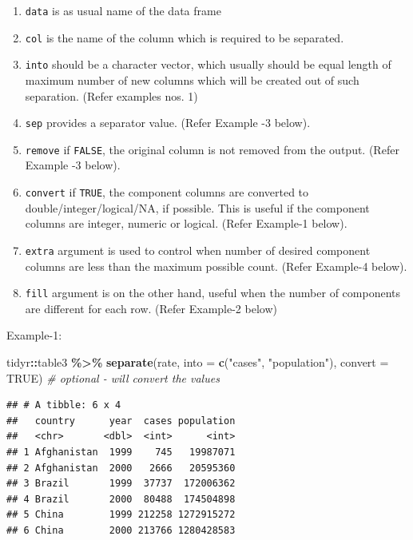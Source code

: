 \documentclass[
]{book}
\newenvironment{Shaded}{\begin{snugshade}}{\end{snugshade}}
\newcommand{\AttributeTok}[1]{\textcolor[rgb]{0.13,0.29,0.53}{#1}}
\newcommand{\CommentTok}[1]{\textcolor[rgb]{0.56,0.35,0.01}{\textit{#1}}}
\newcommand{\ConstantTok}[1]{\textcolor[rgb]{0.56,0.35,0.01}{#1}}
\newcommand{\FunctionTok}[1]{\textcolor[rgb]{0.13,0.29,0.53}{\textbf{#1}}}
\newcommand{\NormalTok}[1]{#1}
\newcommand{\SpecialCharTok}[1]{\textcolor[rgb]{0.81,0.36,0.00}{\textbf{#1}}}
\newcommand{\StringTok}[1]{\textcolor[rgb]{0.31,0.60,0.02}{#1}}
\providecommand{\tightlist}{%
  \setlength{\itemsep}{0pt}\setlength{\parskip}{0pt}}
\begin{document}
\begin{enumerate}
\def\labelenumi{\arabic{enumi}.}
\tightlist
\item
  \texttt{data} is as usual name of the data frame
\item
  \texttt{col} is the name of the column which is required to be separated.
\item
  \texttt{into} should be a character vector, which usually should be equal length of maximum number of new columns which will be created out of such separation. (Refer examples nos. 1)
\item
  \texttt{sep} provides a separator value. (Refer Example -3 below).
\item
  \texttt{remove} if \texttt{FALSE}, the original column is not removed from the output. (Refer Example -3 below).
\item
  \texttt{convert} if \texttt{TRUE}, the component columns are converted to double/integer/logical/NA, if possible. This is useful if the component columns are integer, numeric or logical. (Refer Example-1 below).
\item
  \texttt{extra} argument is used to control when number of desired component columns are less than the maximum possible count. (Refer Example-4 below).
\item
  \texttt{fill} argument is on the other hand, useful when the number of components are different for each row. (Refer Example-2 below)
\end{enumerate}

Example-1:

\begin{Shaded}
\begin{Highlighting}[]
\NormalTok{tidyr}\SpecialCharTok{::}\NormalTok{table3 }\SpecialCharTok{\%\textgreater{}\%} 
  \FunctionTok{separate}\NormalTok{(rate, }\AttributeTok{into =} \FunctionTok{c}\NormalTok{(}\StringTok{"cases"}\NormalTok{, }\StringTok{"population"}\NormalTok{),}
           \AttributeTok{convert =} \ConstantTok{TRUE}\NormalTok{) }\CommentTok{\# optional {-} will convert the values}
\end{Highlighting}
\end{Shaded}

\begin{verbatim}
## # A tibble: 6 x 4
##   country      year  cases population
##   <chr>       <dbl>  <int>      <int>
## 1 Afghanistan  1999    745   19987071
## 2 Afghanistan  2000   2666   20595360
## 3 Brazil       1999  37737  172006362
## 4 Brazil       2000  80488  174504898
## 5 China        1999 212258 1272915272
## 6 China        2000 213766 1280428583
\end{verbatim}
\end{document}
